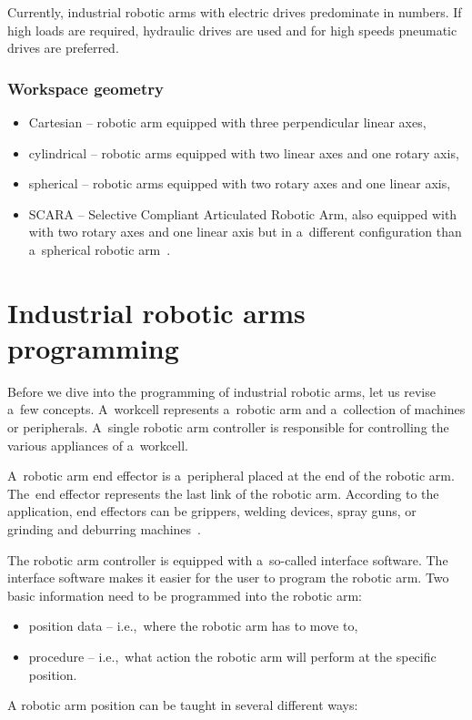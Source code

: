 Currently, industrial robotic arms with electric drives predominate in numbers. If high loads are required, hydraulic drives are used and for high speeds pneumatic drives are preferred.

\subsubsection*{Workspace geometry}

\begin{itemize}
    \item Cartesian -- robotic arm equipped with three perpendicular linear axes,
    \item cylindrical -- robotic arms equipped with two linear axes and one rotary axis,
    \item spherical --  robotic arms equipped with two rotary axes and one linear axis,
    \item SCARA -- Selective Compliant Articulated Robotic Arm, also equipped with with two rotary axes and one linear axis but in a~different configuration than a~spherical robotic arm~\cite{vsb_2007}.
\end{itemize}

\section{Industrial robotic arms programming}

Before we dive into the programming of industrial robotic arms, let us revise a~few concepts. A~workcell represents a~robotic arm and a~collection of machines or peripherals. A~single robotic arm controller is responsible for controlling the various appliances of a~workcell.

A~robotic arm end effector is a~peripheral placed at the end of the robotic arm. The~end effector represents the last link of the robotic arm. According to the application, end effectors can be grippers, welding devices, spray guns, or grinding and deburring machines~\cite{monkman_2007}.

The robotic arm controller is equipped with a~so-called interface software. The interface software makes it easier for the user to program the robotic arm. Two basic information need to be programmed into the robotic arm:

\begin{itemize}
    \item position data -- i.e.,~where the robotic arm has to move to,
    \item procedure -- i.e.,~what action the robotic arm will perform at the specific position.
\end{itemize}
A robotic arm position can be taught in several different ways:

